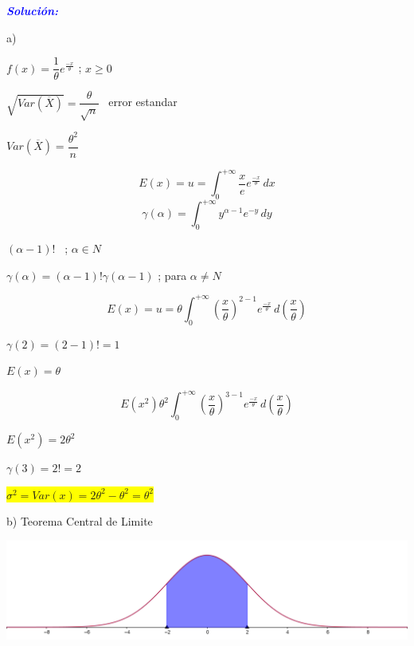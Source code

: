 \documentclass[a4paper,openright,12pt]{book}
\begin{document}
{\begin{center}
\textbf{\textit{\textcolor{blue}{Solución:}}}\\
\end{center}

a) 
\begin{center}
	$f(x) = \dfrac{1}{\theta}e^{\frac{-x}{\theta}}$ ; $x\geqslant 0$
\end{center}
\begin{center}
	$\sqrt{Var(\overline{X})} = \dfrac{\theta}{\sqrt{n}}$ \  error estandar
\end{center}
\begin{center}
	$Var(\overline{X}) = \dfrac{\theta^{2}}{n}$
\end{center}
\[ E(x) = u = \int_{0}^{+\infty} \! \dfrac{x}{e}e^\frac{-x}{\theta} \, dx 
\]
\[\gamma(\alpha)=\int_{0}^{+\infty} \! y^{\alpha-1}e^{-y} \, dy\]
\begin{center}
	$(\alpha-1)!$ \ ; $ \alpha \in N $
\end{center}
\begin{center}
	$\gamma(\alpha) = (\alpha-1)!\gamma(\alpha-1)$ ; para $\alpha \neq N$
\end{center}
\[ E(x) = u = \theta\int_{0}^{+\infty} \! (\dfrac{x}{\theta})^{2-1}e^\frac{-x}{\theta} \, d(\frac{x}{\theta})
\]
\begin{center}
	$\gamma(2)=(2-1)! = 1$
\end{center}
\begin{center}
	$ E(x)= \theta $
\end{center}
\[ E(x^{2})  \theta^{2}\int_{0}^{+\infty} \! (\dfrac{x}{\theta})^{3-1}e^\frac{-x}{\theta} \, d(\frac{x}{\theta})
\]
\begin{center}
	$E(x^{2})=2\theta^{2}$
\end{center}
\begin{center}
	$\gamma(3)= 2!= 2$
\end{center}
\begin{center}
	\colorbox{yellow}{$\sigma^{2} = Var(x) = 2\theta^{2}-\theta^{2} = \theta^{2}$}
\end{center}

b) Teorema Central de Limite\\
\begin{center}
	\includegraphics[scale=0.15]{ANDERSON/Imagenes/geogebra-export} 
\end{center}

}
\end{document}
